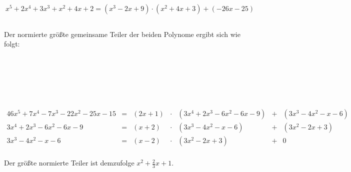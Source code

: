 \documentclass[10pt,a4paper,oneside,ngerman,numbers=noenddot]{scrartcl}
\begin{document}
\section{} %
\subsection{} %

\begin{equation*}
x^{5} + 2x^{4} + 3x^{3} + x^{2} + 4x + 2 = (x^{3} -2x + 9) \cdot (x^{2} + 4x + 3) + (-26x - 25)
\end{equation*}
\subsection{} %
Der normierte größte gemeinsame Teiler der beiden Polynome ergibt sich wie folgt:\\

\hspace{-2.5cm}
\\
\\
\\
\\
\\
\\

\begin{alignat*}{4}
6x^{5} + 7x^{4} - 7x^{3} - 22x^{2} - 25x - 15 &=& (2x + 1) &\cdot & (3x^{4} + 2x^{3} - 6x^{2} - 6x - 9) &+& (3x^{3} - 4x^{2} - x - 6) \\
3x^{4} + 2x^{3} - 6x^{2} - 6x - 9 &=& (x + 2) &\cdot & (3x^{3} - 4x^{2} - x - 6) &+& (3x^{2} - 2x + 3) \\
3x^{3} - 4x^{2} - x - 6 &=& (x - 2) &\cdot & (3x^{2} - 2x + 3) &+& 0
\end{alignat*}
\\
Der größte normierte Teiler ist demzufolge $x^2 + \frac{2}{3}x + 1$.
\end{document}
